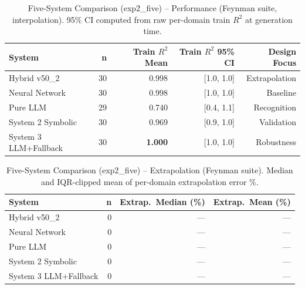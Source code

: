 \documentclass[twoside,11pt]{article}
\begin{document}
\begin{table}[t]
\centering
\caption{Five-System Comparison (exp2\_five) -- Performance (Feynman suite,
  interpolation). 95\% CI computed from raw per-domain train $R^2$ at
  generation time.}
\label{tab:five_systems_performance_exp2five}
\begin{tabular}{lrrrr}
\toprule
\textbf{System} & \textbf{n} & \textbf{Train $R^2$ Mean}
  & \textbf{Train $R^2$ 95\% CI} & \textbf{Design Focus} \\
\midrule
Hybrid v50\_2 & 30 & 0.998 & [1.0, 1.0] & Extrapolation \\
Neural Network & 30 & 0.998 & [1.0, 1.0] & Baseline \\
Pure LLM & 29 & 0.740 & [0.4, 1.1] & Recognition \\
System 2 Symbolic & 30 & 0.969 & [0.9, 1.0] & Validation \\
System 3 LLM+Fallback & 30 & \textbf{1.000} & [1.0, 1.0] & Robustness \\
\bottomrule
\end{tabular}
\end{table}

\begin{table}[t]
\centering
\caption{Five-System Comparison (exp2\_five) -- Extrapolation (Feynman
  suite). Median and IQR-clipped mean of per-domain extrapolation error \%.}
\label{tab:five_systems_extrapolation_exp2five}
\begin{tabular}{lrrr}
\toprule
\textbf{System} & \textbf{n}
  & \textbf{Extrap.\ Median (\%)} & \textbf{Extrap.\ Mean (\%)} \\
\midrule
Hybrid v50\_2 & 0 & --- & --- \\
Neural Network & 0 & --- & --- \\
Pure LLM & 0 & --- & --- \\
System 2 Symbolic & 0 & --- & --- \\
System 3 LLM+Fallback & 0 & --- & --- \\
\bottomrule
\end{tabular}
\end{table}
\end{document}
